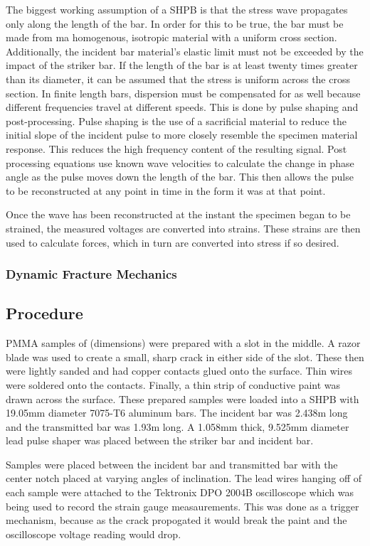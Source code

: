 \documentclass[12pt]{article}
\begin{document}
The biggest working assumption of a SHPB is that the stress wave propagates only along the length of the bar. In order for this to be true, the bar must be made from ma homogenous, isotropic material with a uniform cross section. Additionally, the incident bar material's elastic limit must not be exceeded by the impact of the striker bar. If the length of the bar is at least twenty times greater than its diameter, it can be assumed that the stress is uniform across the cross section. In finite length bars, dispersion must be compensated for as well because different frequencies travel at different speeds. This is done by pulse shaping and post-processing. Pulse shaping is the use of a sacrificial material to reduce the initial slope of the incident pulse to more closely resemble the specimen material response. This reduces the high frequency content of the resulting signal. Post processing equations use known wave velocities to calculate the change in phase angle as the pulse moves down the length of the bar. This then allows the pulse to be reconstructed at any point in time in the form it was at that point.

Once the wave has been reconstructed at the instant the specimen began to be strained, the measured voltages are converted into strains. These strains are then used to calculate forces, which in turn are converted into stress if so desired. 


\subsubsection{Dynamic Fracture Mechanics} %

\subsection{Procedure} %
PMMA samples of (dimensions) were prepared with a slot in the middle. A razor blade was used to create a small, sharp crack in either side of the slot. These then were lightly sanded and had copper contacts glued onto the surface. Thin wires were soldered onto the contacts. Finally, a thin strip of conductive paint was drawn across the surface. These prepared samples were loaded into a SHPB with 19.05mm diameter 7075-T6 aluminum bars. The incident bar was 2.438m long and the transmitted bar was 1.93m long. A 1.058mm thick, 9.525mm diameter lead pulse shaper was placed between the striker bar and incident bar.

Samples were placed between the incident bar and transmitted bar with the center notch placed at varying angles of inclination. The lead wires hanging off of each sample were attached to the Tektronix DPO 2004B oscilloscope which was being used to record the strain gauge measaurements. This was done as a trigger mechanism, because as the crack propogated it would break the paint and the oscilloscope voltage reading would drop. 
\end{document}
